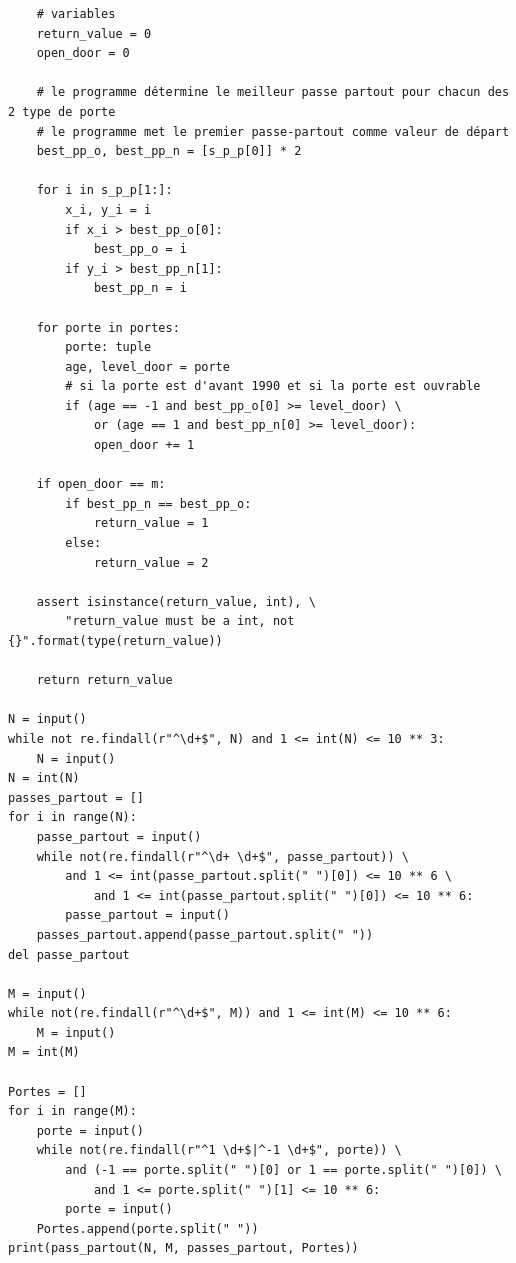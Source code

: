 \documentclass{article}
\begin{document}
\begin{verbatim}
    # variables
    return_value = 0
    open_door = 0

    # le programme détermine le meilleur passe partout pour chacun des 2 type de porte
    # le programme met le premier passe-partout comme valeur de départ
    best_pp_o, best_pp_n = [s_p_p[0]] * 2

    for i in s_p_p[1:]:
        x_i, y_i = i
        if x_i > best_pp_o[0]:
            best_pp_o = i
        if y_i > best_pp_n[1]:
            best_pp_n = i

    for porte in portes:
        porte: tuple
        age, level_door = porte
        # si la porte est d'avant 1990 et si la porte est ouvrable
        if (age == -1 and best_pp_o[0] >= level_door) \
            or (age == 1 and best_pp_n[0] >= level_door):
            open_door += 1

    if open_door == m:
        if best_pp_n == best_pp_o:
            return_value = 1
        else:
            return_value = 2

    assert isinstance(return_value, int), \
        "return_value must be a int, not {}".format(type(return_value))

    return return_value

N = input()
while not re.findall(r"^\d+$", N) and 1 <= int(N) <= 10 ** 3:
    N = input()
N = int(N)
passes_partout = []
for i in range(N):
    passe_partout = input()
    while not(re.findall(r"^\d+ \d+$", passe_partout)) \
        and 1 <= int(passe_partout.split(" ")[0]) <= 10 ** 6 \
            and 1 <= int(passe_partout.split(" ")[0]) <= 10 ** 6:
        passe_partout = input()
    passes_partout.append(passe_partout.split(" "))
del passe_partout

M = input()
while not(re.findall(r"^\d+$", M)) and 1 <= int(M) <= 10 ** 6:
    M = input()
M = int(M)

Portes = []
for i in range(M):
    porte = input()
    while not(re.findall(r"^1 \d+$|^-1 \d+$", porte)) \
        and (-1 == porte.split(" ")[0] or 1 == porte.split(" ")[0]) \
            and 1 <= porte.split(" ")[1] <= 10 ** 6:
        porte = input()
    Portes.append(porte.split(" "))
print(pass_partout(N, M, passes_partout, Portes))

            \end{verbatim}
        \newpage
\end{document}
